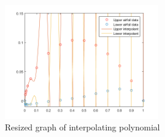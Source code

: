 \documentclass[11pt]{article}
\begin{document}
\begin{enumerate}
\begin{enumerate}[(a)]
				\begin{figure}[H]
					\centering
					\includegraphics[width=0.6\textwidth]{holmes5_16b_resize.png}
					\caption{Resized graph of interpolating polynomial}
				\end{figure} \

		\end{enumerate}


\end{enumerate}
\end{document}
